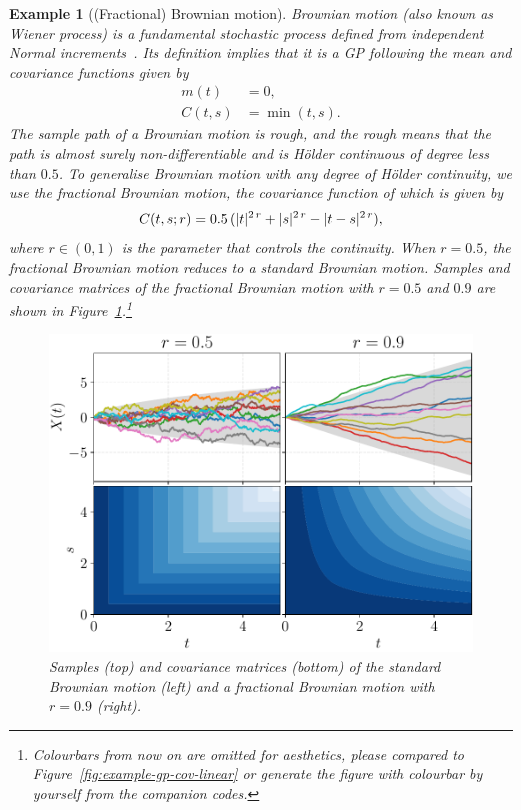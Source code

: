 \documentclass[]{article}
\newtheorem{example}[theorem]{Example}
\begin{document}
\begin{example}[(Fractional) Brownian motion]
	Brownian motion (also known as Wiener process) is a fundamental stochastic process defined from independent Normal increments~\citep[see, e.g.,][for the precise definition]{Karatzas1991}. Its definition implies that it is a GP following the mean and covariance functions given by
	\begin{equation*}
		\begin{split}
			m(t) &= 0,\\
			C(t, s) &= \min(t, s).
		\end{split}
	\end{equation*}
	The sample path of a Brownian motion is rough, and the rough means that the path is almost surely non-differentiable and is H\"{o}lder continuous of degree less than $0.5$. To generalise Brownian motion with any degree of H\"{o}lder continuity, we use the fractional Brownian motion, the covariance function of which is given by
	\begin{equation*}
		C(t, s; r) = 0.5 \, (\lvert t\rvert^{2 \, r} + \lvert s\rvert^{2 \, r} - \lvert t - s\rvert^{2 \, r}),
	\end{equation*}
	where $r \in (0, 1)$ is the parameter that controls the continuity. When $r=0.5$, the fractional Brownian motion reduces to a standard Brownian motion. Samples and covariance matrices of the fractional Brownian motion with $r=0.5$ and $0.9$ are shown in Figure~\ref{fig:fBM}.\footnote{Colourbars from now on are omitted for aesthetics, please compared to Figure~\ref{fig:example-gp-cov-linear} or generate the figure with colourbar by yourself from the companion codes.}
	\begin{figure}[h!]
		\centering
		\includegraphics[width=.8\linewidth]{figs/sample-cov-fbm}
		\caption{Samples (top) and covariance matrices (bottom) of the standard Brownian motion (left) and a fractional Brownian motion with $r=0.9$ (right).}
		\label{fig:fBM}
	\end{figure}
\end{example}
\end{document}

